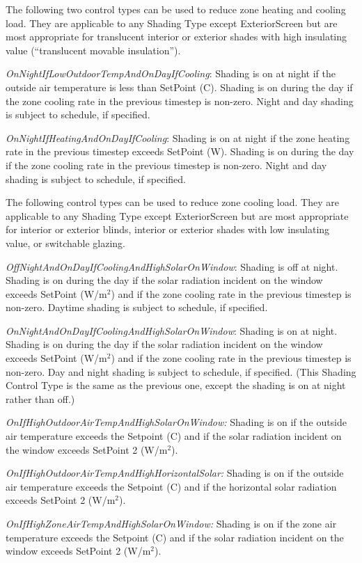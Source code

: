 The following two control types can be used to reduce zone heating and cooling load. They are applicable to any Shading Type except ExteriorScreen but are most appropriate for translucent interior or exterior shades with high insulating value (``translucent movable insulation'').

\emph{OnNightIfLowOutdoorTempAndOnDayIfCooling}: Shading is on at night if the outside air temperature is less than SetPoint (C). Shading is on during the day if the zone cooling rate in the previous timestep is non-zero. Night and day shading is subject to schedule, if specified.

\emph{OnNightIfHeatingAndOnDayIfCooling}: Shading is on at night if the zone heating rate in the previous timestep exceeds SetPoint (W). Shading is on during the day if the zone cooling rate in the previous timestep is non-zero. Night and day shading is subject to schedule, if specified.

The following control types can be used to reduce zone cooling load. They are applicable to any Shading Type except ExteriorScreen but are most appropriate for interior or exterior blinds, interior or exterior shades with low insulating value, or switchable glazing.

\emph{OffNightAndOnDayIfCoolingAndHighSolarOnWindow}: Shading is off at night. Shading is on during the day if the solar radiation incident on the window exceeds SetPoint (W/m\(^{2}\)) and if the zone cooling rate in the previous timestep is non-zero. Daytime shading is subject to schedule, if specified.

\emph{OnNightAndOnDayIfCoolingAndHighSolarOnWindow}: Shading is on at night. Shading is on during the day if the solar radiation incident on the window exceeds SetPoint (W/m\(^{2}\)) and if the zone cooling rate in the previous timestep is non-zero. Day and night shading is subject to schedule, if specified. (This Shading Control Type is the same as the previous one, except the shading is on at night rather than off.)

\emph{OnIfHighOutdoorAirTempAndHighSolarOnWindow:} Shading is on if the outside air temperature exceeds the Setpoint (C) and if the solar radiation incident on the window exceeds SetPoint 2 (W/m\(^{2}\)).

\emph{OnIfHighOutdoorAirTempAndHighHorizontalSolar:} Shading is on if the outside air temperature exceeds the Setpoint (C) and if the horizontal solar radiation exceeds SetPoint 2 (W/m\(^{2}\)).

\emph{OnIfHighZoneAirTempAndHighSolarOnWindow:} Shading is on if the zone air temperature exceeds the Setpoint (C) and if the solar radiation incident on the window exceeds SetPoint 2 (W/m\(^{2}\)).

